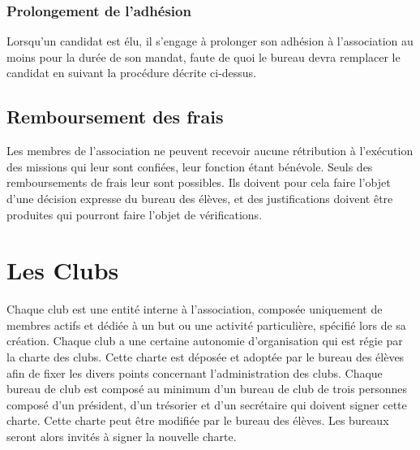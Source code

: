 \documentclass{article} %
\begin{document}
%				
%	
	
			\subsubsection{Prolongement de l'adhésion}
\label{ssub:prolongement_de_l_adhesion}
				Lorsqu’un candidat est élu, il s’engage à prolonger son adhésion
				à l’association au moins pour la durée de son mandat, faute de
				quoi le bureau devra remplacer le candidat en suivant
				la procédure décrite ci-dessus.
				
				\subsection{Remboursement des frais}
\label{sub:remboursement_des_frais}

			Les membres de l’association ne peuvent recevoir aucune rétribution
			à l'exécution des missions qui leur sont confiées, leur fonction
			étant bénévole. Seuls des remboursements de frais leur sont
			possibles. Ils doivent pour cela faire l'objet d'une décision
			expresse du bureau des élèves, et des justifications doivent être
			produites qui pourront faire l'objet de vérifications.

	\section{Les Clubs}
\label{sec:les_clubs}

		Chaque club est une entité interne à l’association, composée uniquement de
		membres actifs et dédiée à un but ou une activité particulière, spécifié lors
		de sa création. Chaque club a une certaine autonomie d'organisation qui est
		régie par la charte des clubs. Cette charte est déposée et adoptée par le
		bureau des élèves afin de fixer les divers points concernant l’administration
		des clubs. Chaque bureau de club est composé au minimum d’un bureau de club
		de trois personnes composé d’un président, d’un trésorier et d’un secrétaire
		qui doivent signer cette charte. Cette charte peut être modifiée par le
		bureau des élèves. Les bureaux seront alors invités à signer la nouvelle
		charte.
\end{document}
